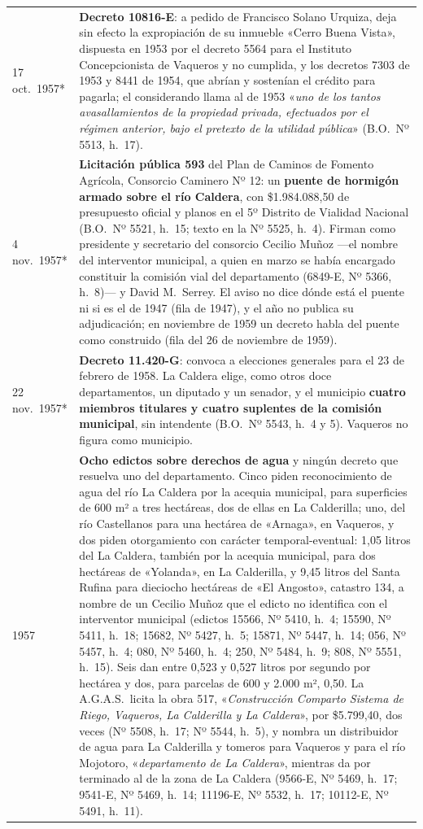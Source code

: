 \begin{longtable}{@{}p{2.7cm}p{10.3cm}@{}}
17 oct.\ 1957* & \textbf{Decreto 10816-E}: a pedido de Francisco Solano Urquiza\index{Urquiza, Francisco S.}, deja sin efecto la expropiación de su inmueble «Cerro Buena Vista», dispuesta en 1953 por el decreto 5564 para el Instituto Concepcionista de Vaqueros y no cumplida, y los decretos 7303 de 1953 y 8441 de 1954, que abrían y sostenían el crédito para pagarla; el considerando llama al de 1953 «\textit{uno de los tantos avasallamientos de la propiedad privada, efectuados por el régimen anterior, bajo el pretexto de la utilidad pública}» (B.O.\ Nº 5513, h.\ 17). \\
4 nov.\ 1957* & \textbf{Licitación pública 593} del Plan de Caminos de Fomento Agrícola, Consorcio Caminero Nº 12: un \textbf{puente de hormigón armado sobre el río Caldera}, con \$1.984.088,50 de presupuesto oficial y planos en el 5º Distrito de Vialidad Nacional (B.O.\ Nº 5521, h.\ 15; texto en la Nº 5525, h.\ 4). Firman como presidente y secretario del consorcio Cecilio Muñoz ---el nombre del interventor municipal, a quien en marzo se había encargado constituir la comisión vial del departamento (6849-E, Nº 5366, h.\ 8)--- y David M.\ Serrey. El aviso no dice dónde está el puente ni si es el de 1947 (fila de 1947), y el año no publica su adjudicación; en noviembre de 1959 un decreto habla del puente como construido (fila del 26 de noviembre de 1959). \\
22 nov.\ 1957* & \textbf{Decreto 11.420-G}: convoca a elecciones generales para el 23 de febrero de 1958. La Caldera elige, como otros doce departamentos, un diputado y un senador, y el municipio \textbf{cuatro miembros titulares y cuatro suplentes de la comisión municipal}, sin intendente (B.O.\ Nº 5543, h.\ 4 y 5). Vaqueros no figura como municipio. \\
1957 & \textbf{Ocho edictos sobre derechos de agua} y ningún decreto que resuelva uno del departamento. Cinco piden reconocimiento de agua del río La Caldera por la acequia municipal, para superficies de 600 m² a tres hectáreas, dos de ellas en La Calderilla; uno, del río Castellanos para una hectárea de «Arnaga», en Vaqueros, y dos piden otorgamiento con carácter temporal-eventual: 1,05 litros del La Caldera, también por la acequia municipal, para dos hectáreas de «Yolanda», en La Calderilla, y 9,45 litros del Santa Rufina para dieciocho hectáreas de «El Angosto», catastro 134, a nombre de un Cecilio Muñoz que el edicto no identifica con el interventor municipal (edictos 15566, Nº 5410, h.\ 4; 15590, Nº 5411, h.\ 18; 15682, Nº 5427, h.\ 5; 15871, Nº 5447, h.\ 14; 056, Nº 5457, h.\ 4; 080, Nº 5460, h.\ 4; 250, Nº 5484, h.\ 9; 808, Nº 5551, h.\ 15). Seis dan entre 0,523 y 0,527 litros por segundo por hectárea y dos, para parcelas de 600 y 2.000 m², 0,50. La A.G.A.S.\ licita la obra 517, «\textit{Construcción Comparto Sistema de Riego, Vaqueros, La Calderilla y La Caldera}», por \$5.799,40, dos veces (Nº 5508, h.\ 17; Nº 5544, h.\ 5), y nombra un distribuidor de agua para La Calderilla y tomeros para Vaqueros y para el río Mojotoro, «\textit{departamento de La Caldera}», mientras da por terminado al de la zona de La Caldera (9566-E, Nº 5469, h.\ 17; 9541-E, Nº 5469, h.\ 14; 11196-E, Nº 5532, h.\ 17; 10112-E, Nº 5491, h.\ 11). \\

\end{longtable}
